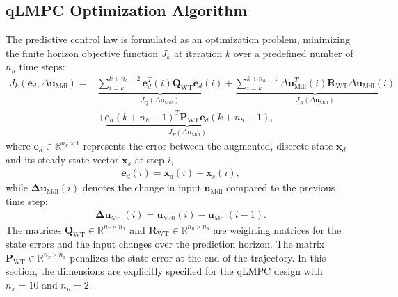 \subsection{qLMPC Optimization Algorithm}\label{sec:qLMPCOptimizationAlgo}
The predictive control law is formulated as an optimization problem, minimizing the finite horizon objective function \( J_k \) at iteration \( k \) over a predefined number of \( n_h \) time steps:
\begin{align*}
    J_k(\bm{e}_d, \Delta \bm{u}_{\text{Mdl}}) = & \underbrace{ \sum_{i=k}^{k+n_h-2}  \bm{e}_{d}^T(i) \bm{Q}_{\text{WT}} \bm{e}_{d}(i)}_{J_Q(\Delta \bm{u}_{\text{Mdl}})} + \underbrace{\sum_{i=k}^{k+n_h-1} \Delta \bm{u}^T_{\text{Mdl}}(i) \bm{R}_{\text{WT}} \Delta \bm{u}_{\text{Mdl}}(i)}_{J_R(\Delta \bm{u}_{\text{Mdl}})} \\
    &+ \underbrace{\bm{e}_{d}(k+n_h-1)^T \bm{P}_{\text{WT}} \bm{e}_{d}(k+n_h-1)}_{J_P(\Delta \bm{u}_{\text{Mdl}})},
\end{align*}
where \( \bm{e}_{d} \in \mathbb{R}^{n_x \times 1} \) represents the error between the augmented, discrete state \( \bm{x}_{d}\) and its steady state vector $\bm{x}_{s}$ at step \( i \),
\begin{align*}
    \bm{e}_{d}(i) = \bm{x}_{d}(i) - \bm{x}_{s}(i),
\end{align*}
 while $\bm{\Delta u}_{\text{Mdl}}(i)$ denotes the change in input  $\bm{u}_{\text{Mdl}}$ compared to the previous time step:
\begin{align*}
    \bm{\Delta u}_{\text{Mdl}}(i) = \bm{u}_{\text{Mdl}}(i) - \bm{u}_{\text{Mdl}}(i-1).
\end{align*}
The matrices \( \bm{Q}_{\text{WT}} \in \mathbb{R}^{n_x \times n_x} \) and \( \bm{R}_{\text{WT}} \in \mathbb{R}^{n_u \times n_u} \) are weighting matrices for the state errors and the input changes over the prediction horizon. The matrix \( \bm{P}_{\text{WT}} \in \mathbb{R}^{n_x \times n_x} \) penalizes the state error at the end of the trajectory. In this section, the dimensions are explicitly specified for the qLMPC design with \( n_x = 10 \) and \( n_u = 2 \).

